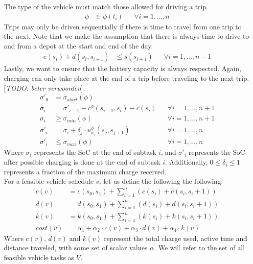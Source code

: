 \documentclass[]{article}
\newcommand{\todo}[1]{{\color{red}[\textit{TODO: #1}]}}
\begin{document}
The type of the vehicle must match those allowed for driving a trip. 
\begin{align}
  \phi &\in \phi(t_i) && \forall i = 1, \dots, n
\end{align}
Trips may only be driven sequentially if there is time to travel from one trip to the next. Note that we make the assumption that there is always time to drive to and from a depot at the start and end of the day. 
\begin{align}
  e(s_i) + d(s_i, s_{i+1}) &\leq s(s_{i+1}) && \forall i = 1, \dots, n-1
\end{align}
Lastly, we want to ensure that the battery capacity is always respected. Again, charging can only take place at the end of a trip before traveling to the next trip. \todo{beter verwoorden}.
\begin{align}
  \sigma'_0 &= \sigma_{start}(\phi) \\
  \sigma_{i} &= \sigma'_{i-1} - c^\phi(s_{i-1}, s_{i}) - c(s_{i}) && \forall i = 1, \dots, n + 1 \\
  \sigma_{i} &\geq \sigma_{min}(\phi) && \forall i = 1, \dots, n + 1 \\
  \sigma'_{i} &= \sigma_{i} + \delta_j \cdot u^\phi_{\sigma_{i}}(s_{j}, s_{j+1}) && \forall i = 1, \dots, n \\
  \sigma'_{i} &\leq \sigma_{max}(\phi) && \forall i = 1, \dots, n
\end{align}
Where $\sigma_i$ represents the SoC at the end of subtask $i$, and $\sigma'_i$ represents the SoC after possible charging is done at the end of subtask $i$. Additionally, $0 \leq \delta_i \leq 1$ represents a fraction of the maximum charge received. \\
For a feasible vehicle schedule $v$, let us define the following the following:
\begin{align}
  c(v) &= c(s_0, s_1) + \sum^{n}_{i = 1}(c(s_i) + c(s_i, s_i + 1))  \\
  d(v) &= d(s_0, s_1) + \sum^{n}_{i = 1}(d(s_i) + d(s_i, s_i + 1))  \\
  k(v) &= k(s_0, s_1) + \sum^{n}_{i = 1}(k(s_i) + k(s_i, s_i + 1))  \\
  cost(v) &= \alpha_1 + \alpha_2 \cdot c(v) + \alpha_3 \cdot d(v) + \alpha_4 \cdot k(v) 
\end{align}
Where $c(v)$, $d(v)$ and $k(v)$ represent the total charge used, active time and distance traveled, with some set of scalar values $\alpha$. We will refer to the set of all feasible vehicle tasks as $V$. \\\\
\end{document}
